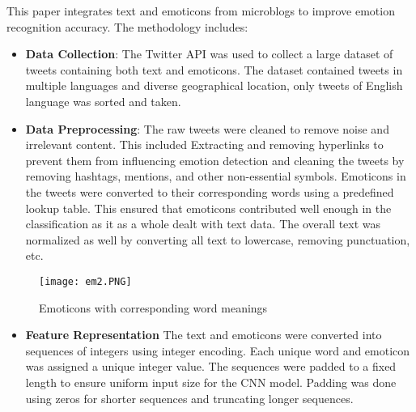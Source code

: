 \documentclass[12pt]{article} %
\begin{document}
  
This paper integrates text and emoticons from microblogs to improve emotion recognition accuracy. The methodology includes:
\begin{itemize}
    \item \textbf{Data Collection}:
    The Twitter API was used to collect a large dataset of tweets containing both text and emoticons. The dataset contained tweets in multiple languages and diverse geographical location, only tweets of English language was sorted and taken. 
\end{itemize}

\begin{itemize}
    \item \textbf{Data Preprocessing}:
    The raw tweets were cleaned to remove noise and irrelevant content. This included Extracting and removing hyperlinks to prevent them from influencing emotion detection and cleaning the tweets by removing hashtags, mentions, and other non-essential symbols. Emoticons in the tweets were converted to their corresponding words using a predefined lookup table. This ensured that emoticons contributed well enough in the classification as it as a whole dealt with text data. The overall text was normalized as well by converting all text to lowercase, removing punctuation, etc.
\end{itemize}

    \begin{figure}[h!]
    \centering
    \texttt{[image: em2.PNG]}                    
    \caption{Emoticons with corresponding word meanings }                              
    \label{Emoticons with corresponding word meanings }
    \end{figure}


\begin{itemize}
    \item \textbf{Feature Representation}
    The text and emoticons were converted into sequences of integers using integer encoding. Each unique word and emoticon was assigned a unique integer value. The sequences were padded to a fixed length to ensure uniform input size for the CNN model. Padding was done using zeros for shorter sequences and truncating longer sequences. 
\end{itemize}
\end{document}
